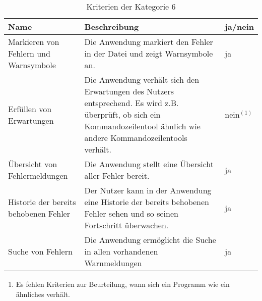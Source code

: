 \begin{table}[t]
    \centering
    \begin{tabularx}{\columnwidth}{XXl}
        \toprule
        \textbf{Name}                         & \textbf{Beschreibung}                                                                                                                                                       & \textbf{ja/nein} \\
        \midrule
        Markieren von Fehlern und Warnsymbole & Die Anwendung markiert den Fehler in der Datei und zeigt Warnsymbole an.                                                                                                    & ja               \\
        \midrule
        Erfüllen von Erwartungen              & Die Anwendung verhält sich den Erwartungen des Nutzers entsprechend. Es wird z.B. überprüft, ob sich ein Kommandozeilentool ähnlich wie andere Kommandozeilentools verhält. & nein$^{(1)}$     \\
        \midrule
        Übersicht von Fehlermeldungen         & Die Anwendung stellt eine Übersicht aller Fehler bereit.                                                                                                                    & ja               \\
        \midrule
        Historie der bereits behobenen Fehler & Der Nutzer kann in der Anwendung eine Historie der bereits behobenen Fehler sehen und so seinen Fortschritt überwachen.                                                     & ja               \\
        \midrule
        Suche von Fehlern                     & Die Anwendung ermöglicht die Suche in allen vorhandenen Warnmeldungen                                                                                                       & ja               \\
        \bottomrule
    \end{tabularx}
    \caption{Kriterien der Kategorie 6}
    \label{tbl:criteria-category-6}
\end{table}

\FloatBarrier

\begin{enumerate}[label= (\arabic*)]
    \item Es fehlen Kriterien zur Beurteilung, wann sich ein Programm wie ein ähnliches verhält.
\end{enumerate}

\vspace{-1cm}

